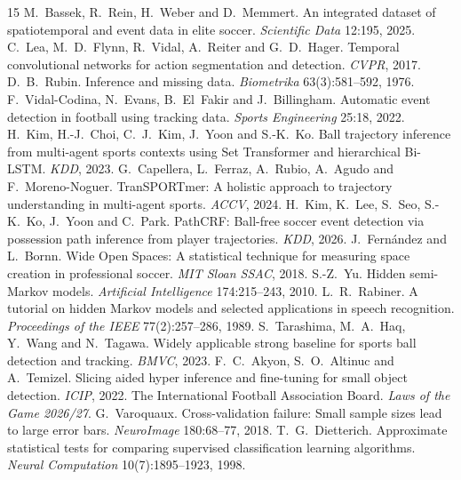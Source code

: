 \documentclass[11pt,a4paper]{article}
\begin{document}
\begin{thebibliography}{15}\footnotesize
  \setlength{\itemsep}{0pt}
   M.~Bassek, R.~Rein, H.~Weber and D.~Memmert. An integrated dataset of spatiotemporal
    and event data in elite soccer. \emph{Scientific Data} 12:195, 2025.
   C.~Lea, M.~D.~Flynn, R.~Vidal, A.~Reiter and G.~D.~Hager. Temporal
    convolutional networks for action segmentation and detection. \emph{CVPR}, 2017.
   D.~B.~Rubin. Inference and missing data. \emph{Biometrika} 63(3):581--592, 1976.
   F.~Vidal-Codina, N.~Evans, B.~El~Fakir and J.~Billingham. Automatic event
    detection in football using tracking data. \emph{Sports Engineering} 25:18, 2022.
   H.~Kim, H.-J.~Choi, C.~J.~Kim, J.~Yoon and S.-K.~Ko. Ball trajectory inference
    from multi-agent sports contexts using Set Transformer and hierarchical Bi-LSTM. \emph{KDD}, 2023.
   G.~Capellera, L.~Ferraz, A.~Rubio, A.~Agudo and F.~Moreno-Noguer.
    TranSPORTmer: A holistic approach to trajectory understanding in multi-agent sports. \emph{ACCV},
    2024.
   H.~Kim, K.~Lee, S.~Seo, S.-K.~Ko, J.~Yoon and C.~Park. PathCRF: Ball-free soccer
    event detection via possession path inference from player trajectories. \emph{KDD}, 2026.
   J.~Fernández and L.~Bornn. Wide Open Spaces: A statistical technique for
    measuring space creation in professional soccer. \emph{MIT Sloan SSAC}, 2018.
   S.-Z.~Yu. Hidden semi-Markov models. \emph{Artificial Intelligence}
    174:215--243, 2010.
   L.~R.~Rabiner. A tutorial on hidden Markov models and selected applications in
    speech recognition. \emph{Proceedings of the IEEE} 77(2):257--286, 1989.
   S.~Tarashima, M.~A.~Haq, Y.~Wang and N.~Tagawa. Widely applicable strong baseline for sports ball detection and
    tracking. \emph{BMVC}, 2023.
   F.~C.~Akyon, S.~O.~Altinuc and A.~Temizel. Slicing aided hyper inference and
    fine-tuning for small object detection. \emph{ICIP}, 2022.
   The International Football Association Board. \emph{Laws of the Game 2026/27}.
   G.~Varoquaux. Cross-validation failure: Small sample sizes lead to large
    error bars. \emph{NeuroImage} 180:68--77, 2018.
   T.~G.~Dietterich. Approximate statistical tests for comparing supervised
    classification learning algorithms. \emph{Neural Computation} 10(7):1895--1923, 1998.
\end{thebibliography}
\end{document}
